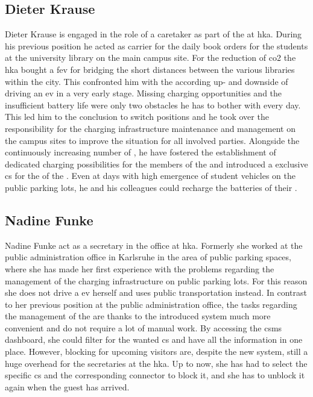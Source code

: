 \subsection{Dieter Krause}
\label{ch:Requirements Engineering:sec:Personas:ssec:Dieter Krause}

Dieter Krause is engaged in the role of a caretaker as part of the  at \acrshort{hka}. During his previous position he acted as carrier for the daily book orders for the students at the university library on the main campus site. 
For the reduction of \acrshort{co2} the \acrshort{hka} bought a \acrshort{fev} for bridging the short distances between the various libraries within the city.
This confronted him with the according up- and downside of driving an \acrshort{ev} in a very early stage.
Missing charging opportunities and the insufficient battery life were only two obstacles he has to bother with every day. This led him to the conclusion to switch positions and he took over the responsibility for the charging infrastructure maintenance and management on the campus sites to improve the situation for all involved parties.
Alongside the continuously increasing number of , he have fostered the establishment of dedicated charging possibilities for the members of the  and introduced a exclusive \acrshort{cs} for the  of the . 
Even at days with high emergence of student vehicles on the public parking lots, he and his colleagues could recharge the batteries of their . 

\subsection{Nadine Funke}
\label{ch:Requirements Engineering:sec:Personas:ssec:Nadine Funke}

Nadine Funke act as a secretary in the  office  at \acrshort{hka}. Formerly she worked at the public administration office in Karlsruhe in the area of public parking spaces, where she has made her first experience with the problems regarding the management of the charging infrastructure on public parking lots.
For this reason she does not drive a \acrshort{ev} herself and uses public transportation instead. In contrast to her previous position at the public administration office, the tasks regarding the management of the  are thanks to the introduced system much more convenient and do not require a lot of manual work.
By accessing the \acrshort{csms} dashboard, she could filter for the wanted \acrshort{cs} and have all the information in one place.
However, blocking  for upcoming visitors are, despite the new system, still a huge overhead for the secretaries at the \acrshort{hka}.
Up to now, she has had to select the specific \acrshort{cs} and the corresponding connector to block it, and she has to unblock it again when the guest has arrived.

